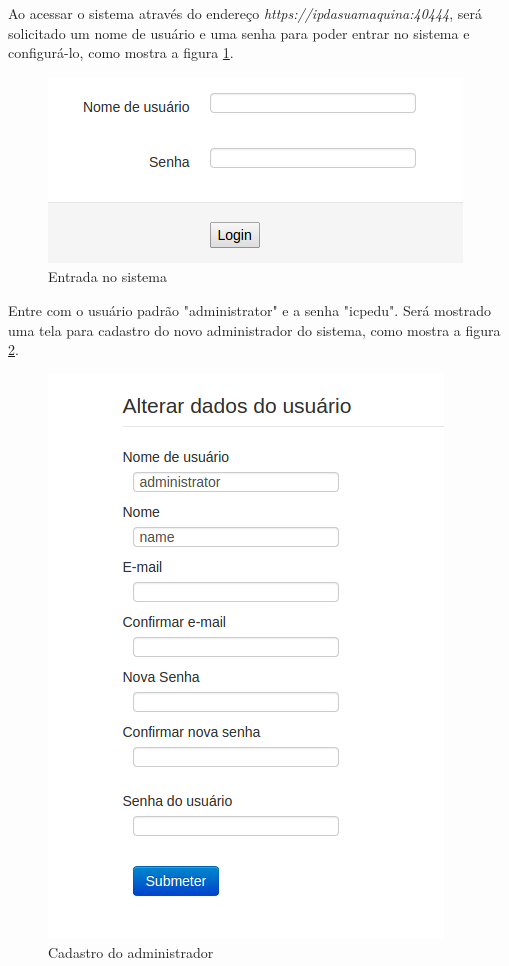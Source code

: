 Ao acessar o sistema através do endereço \textit{https://ipdasuamaquina:40444}, será solicitado um nome de usuário e uma senha para poder entrar no sistema e configurá-lo, como mostra a figura \ref{fig:entrada}.

\begin{figure}[ht]
     \centering
     \includegraphics[scale=0.6]{images/entrada.png}
     \caption{Entrada no sistema}
     \label{fig:entrada}
\end{figure}

    Entre com o usuário padrão "administrator" e a senha "icpedu". Será mostrado uma tela para cadastro do novo administrador do sistema, como mostra a figura \ref{fig:inicioadmin}.

\begin{figure}[ht]
     \centering
     \includegraphics[scale=0.5]{images/inicioadmin.png}
     \caption{Cadastro do administrador}
     \label{fig:inicioadmin}
\end{figure}

